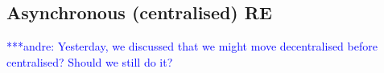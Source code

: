 \documentclass{rspublic}
\newcommand{\jhanote}[1]{ {\textcolor{red} { ***shantenu: #1 }}}
\newcommand{\alnote}[1]{ {\textcolor{blue} { ***andre: #1 }}}
\newcommand{\athotanote}[1]{ {\textcolor{green} { ***athota: #1 }}}
\newcommand{\alnote}[1]{}
\newcommand{\athotanote}[1]{}
\newcommand{\jhanote}[1]{}
\begin{document}


\subsection{Asynchronous (centralised) RE}
\alnote{Yesterday, we discussed that we might move decentralised before
centralised? Should we still do it?}






\end{document}
